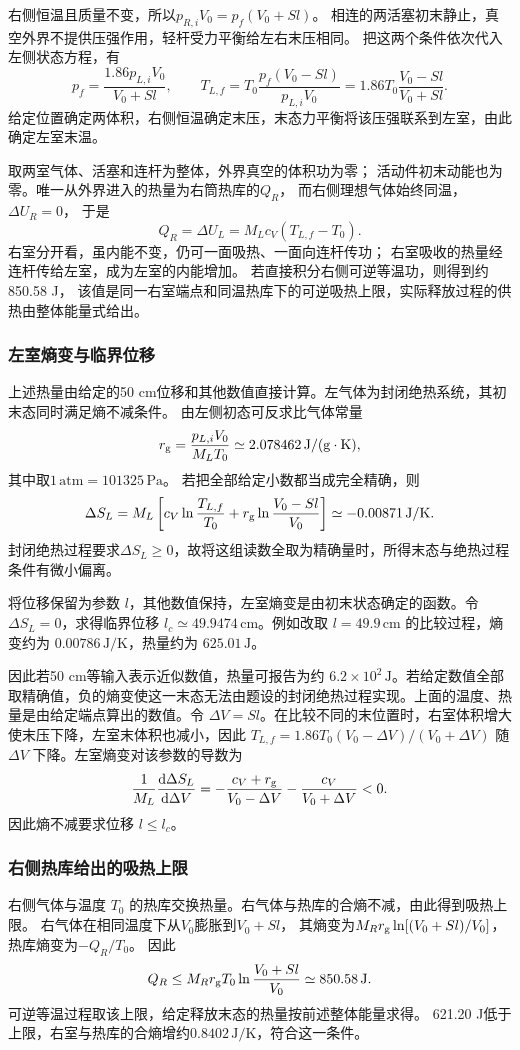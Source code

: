 \documentclass[UTF8,fontset=fandol,a4paper,11pt]{ctexart}
\newcommand{\dd}{\mathop{}\!\mathrm{d}}
\begin{document}
右侧恒温且质量不变，所以$p_{R,i}V_0=p_f(V_0+Sl)$。
相连的两活塞初末静止，真空外界不提供压强作用，轻杆受力平衡给左右末压相同。
把这两个条件依次代入左侧状态方程，有
\[
p_f=\frac{1.86p_{L,i}V_0}{V_0+Sl},\qquad
T_{L,f}=T_0\frac{p_f(V_0-Sl)}{p_{L,i}V_0}
=1.86T_0\frac{V_0-Sl}{V_0+Sl}.
\]
给定位置确定两体积，右侧恒温确定末压，末态力平衡将该压强联系到左室，由此确定左室末温。

取两室气体、活塞和连杆为整体，外界真空的体积功为零；
活动件初末动能也为零。唯一从外界进入的热量为右筒热库的$Q_R$，
而右侧理想气体始终同温，$\Delta U_R=0$，
于是
\[
Q_R=\Delta U_L=M_Lc_V(T_{L,f}-T_0).
\]
右室分开看，虽内能不变，仍可一面吸热、一面向连杆传功；
右室吸收的热量经连杆传给左室，成为左室的内能增加。
若直接积分右侧可逆等温功，则得到约850.58 J，
该值是同一右室端点和同温热库下的可逆吸热上限，实际释放过程的供热由整体能量式给出。

\subsubsection*{左室熵变与临界位移}
上述热量由给定的50 cm位移和其他数值直接计算。左气体为封闭绝热系统，其初末态同时满足熵不减条件。
由左侧初态可反求比气体常量
\[
r_{\rm g}=\frac{p_{L,i}V_0}{M_LT_0}
\simeq2.078462\,\mathrm{J/(g\cdot K)},
\]
其中取$1\,\mathrm{atm}=101325\,\mathrm{Pa}$。
若把全部给定小数都当成完全精确，则
\[
\Delta S_L=M_L\left[
c_V\ln\frac{T_{L,f}}{T_0}
+r_{\rm g}\ln\frac{V_0-Sl}{V_0}\right]
\simeq-0.00871\,\mathrm{J/K}.
\]
封闭绝热过程要求$\Delta S_L\ge0$，故将这组读数全取为精确量时，所得末态与绝热过程条件有微小偏离。

将位移保留为参数 $l$，其他数值保持，左室熵变是由初末状态确定的函数。令 $\Delta S_L=0$，求得临界位移 $l_c\simeq49.9474\,\mathrm{cm}$。例如改取 $l=49.9\,\mathrm{cm}$ 的比较过程，熵变约为 $0.00786\,\mathrm{J/K}$，热量约为 $625.01\,\mathrm J$。

因此若50 cm等输入表示近似数值，热量可报告为约 $6.2\times10^2\,\mathrm J$。若给定数值全部取精确值，负的熵变使这一末态无法由题设的封闭绝热过程实现。上面的温度、热量是由给定端点算出的数值。令 $\Delta V=Sl$。在比较不同的末位置时，右室体积增大使末压下降，左室末体积也减小，因此 $T_{L,f}=1.86T_0(V_0-\Delta V)/(V_0+\Delta V)$ 随 $\Delta V$ 下降。左室熵变对该参数的导数为
\[
\frac{1}{M_L}\frac{\dd\Delta S_L}{\dd\Delta V}
=-\frac{c_V+r_{\rm g}}{V_0-\Delta V}
-\frac{c_V}{V_0+\Delta V}<0 .
\]
因此熵不减要求位移 $l\le l_c$。
\subsubsection*{右侧热库给出的吸热上限}
右侧气体与温度 $T_0$ 的热库交换热量。右气体与热库的合熵不减，由此得到吸热上限。
右气体在相同温度下从$V_0$膨胀到$V_0+Sl$，
其熵变为$M_Rr_{\rm g}\ln[(V_0+Sl)/V_0]$，热库熵变为$-Q_R/T_0$。
因此
\[
Q_R\le M_Rr_{\rm g}T_0\ln\frac{V_0+Sl}{V_0}
\simeq850.58\,\mathrm J.
\]
可逆等温过程取该上限，给定释放末态的热量按前述整体能量求得。
621.20 J低于上限，右室与热库的合熵增约$0.8402\,\mathrm{J/K}$，符合这一条件。
\end{document}
